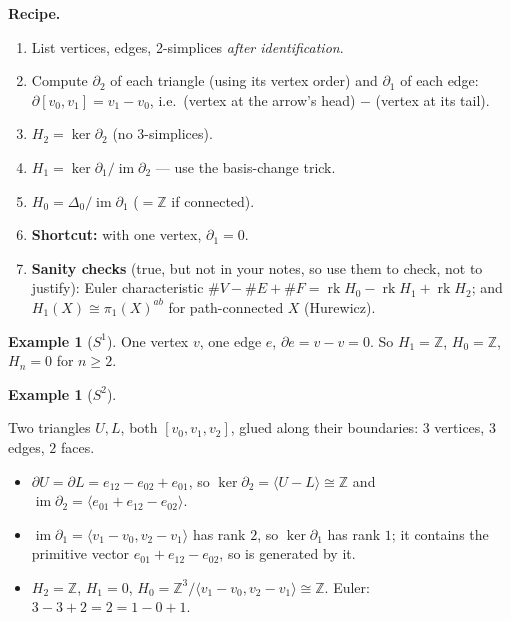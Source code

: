 \documentclass[11pt]{article}
\newcommand{\Z}{\mathbb Z}
\newcommand{\im}{\operatorname{im}}
\newcommand{\fig}[2]{\begin{center}\resizebox{#2}{!}{}\end{center}}
\theoremstyle{definition}
\newtheorem{ex}[thm]{Example}
\begin{document}
\textbf{Recipe.}
\begin{enumerate}
\item List vertices, edges, 2-simplices \emph{after identification}.
\item Compute $\partial_2$ of each triangle (using its vertex order) and $\partial_1$ of each edge: $\partial[v_0,v_1]=v_1-v_0$, i.e.\ (vertex at the arrow's head) $-$ (vertex at its tail).
\item $H_2=\ker\partial_2$ (no 3-simplices).
\item $H_1=\ker\partial_1/\im\partial_2$ --- use the basis-change trick.
\item $H_0=\Delta_0/\im\partial_1$ ($=\Z$ if connected).
\item \textbf{Shortcut:} with one vertex, $\partial_1=0$.
\item \textbf{Sanity checks} (true, but not in your notes, so use them to check, not to justify):
Euler characteristic $\#V-\#E+\#F=\operatorname{rk}H_0-\operatorname{rk}H_1+\operatorname{rk}H_2$; and $H_1(X)\cong\pi_1(X)^{ab}$ for path-connected $X$ (Hurewicz).
\end{enumerate}

\begin{ex}[$S^1$]
One vertex $v$, one edge $e$, $\partial e=v-v=0$. So $H_1=\Z$, $H_0=\Z$, $H_n=0$ for $n\ge2$.
\end{ex}

\begin{ex}[$S^2$]\label{ex:s2}
\fig{s2-delta}{0.6\textwidth}
Two triangles $U,L$, both $[v_0,v_1,v_2]$, glued along their boundaries: $3$ vertices, $3$ edges, $2$ faces.
\begin{itemize}
\item $\partial U=\partial L=e_{12}-e_{02}+e_{01}$, so $\ker\partial_2=\langle U-L\rangle\cong\Z$ and $\im\partial_2=\langle e_{01}+e_{12}-e_{02}\rangle$.
\item $\im\partial_1=\langle v_1-v_0,v_2-v_1\rangle$ has rank $2$, so $\ker\partial_1$ has rank $1$; it contains the primitive vector $e_{01}+e_{12}-e_{02}$, so is generated by it.
\item $H_2=\Z$, $H_1=0$, $H_0=\Z^3/\langle v_1-v_0,v_2-v_1\rangle\cong\Z$. Euler: $3-3+2=2=1-0+1$.
\end{itemize}
\end{ex}
\end{document}
